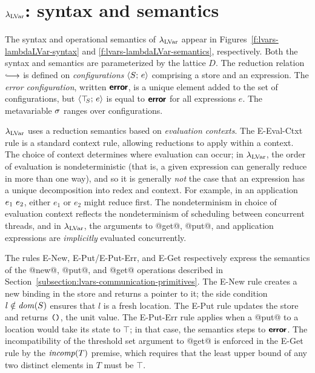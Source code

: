 \section{$\lambda_{\textrm{LVar}}$: syntax and semantics}\label{s:lvars-lambdalvar}


\FigLambdaLVarGrammar

\FigLambdaLVarSemantics

The syntax and operational semantics of $\lambda_{\textrm{LVar}}$ appear in
Figures~\ref{f:lvars-lambdaLVar-syntax} and
\ref{f:lvars-lambdaLVar-semantics}, respectively.  Both the
syntax and semantics are parameterized by the lattice $D$.  The
reduction relation $\parstepsto$ is defined on \emph{configurations}
$\langle S;\, e \rangle$ comprising a store and an expression.  The \emph{error
  configuration}, written $\textbf{\textsf{error}}$, is a unique element added to the
set of configurations, but $\langle \top\hspace{-0.85mm}_{S};\, e \rangle$ is equal to $\textbf{\textsf{error}}$
for all expressions $e$.  The metavariable $\sigma$ ranges over
configurations.

$\lambda_{\textrm{LVar}}$ uses a reduction semantics based on \emph{evaluation
  contexts}.  The {\sc E-Eval-Ctxt} rule is a standard context rule,
allowing reductions to apply within a context.  The choice of context
determines where evaluation can occur; in $\lambda_{\textrm{LVar}}$, the order of
evaluation is nondeterministic (that is, a given expression can
generally reduce in more than one way), and so it is generally
\emph{not} the case that an expression has a unique decomposition into
redex and context.  For example, in an application $e_1~e_2$,
either $e_1$ or $e_2$ might reduce first.  The nondeterminism in
choice of evaluation context reflects the nondeterminism of scheduling
between concurrent threads, and in $\lambda_{\textrm{LVar}}$, the arguments to
@get@, @put@, and application expressions are \emph{implicitly}
evaluated concurrently.

The rules {\sc E-New}, {\sc E-Put}/{\sc E-Put-Err}, and {\sc E-Get}
respectively express the semantics of the @new@, @put@, and @get@
operations described in
Section~\ref{subsection:lvars-communication-primitives}.  The {\sc
  E-New} rule creates a new binding in the store and returns a pointer
to it; the side condition $l \notin \mathit{dom}(S)$ ensures that $l$ is a
fresh location.  The {\sc E-Put} rule updates the store and returns
$\mbox{\texttt{()}}$, the unit value.  The {\sc E-Put-Err} rule applies when a
@put@ to a location would take its state to $\top$; in that case, the
semantics steps to $\textbf{\textsf{error}}$.  The incompatibility of the threshold set
argument to @get@ is enforced in the {\sc E-Get} rule by the
$\mathit{incomp}(T)$ premise, which requires that the least upper bound of any
two distinct elements in $T$ must be $\top$.


